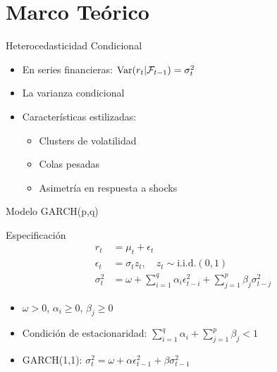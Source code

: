 \section{Marco Teórico}

\begin{frame}{Heterocedasticidad Condicional}
    \begin{itemize}
        \item<1-> En series financieras: $\text{Var}(r_t | {\mathcal F}_{t-1}) = \sigma_t^2$
        \item<2-> La varianza condicional 
        \item<3-> Características estilizadas:
        \begin{itemize}
            \item Clusters de volatilidad
            \item Colas pesadas
            \item Asimetría en respuesta a shocks
        \end{itemize}
    \end{itemize}
    
    \vspace{1em}
    
\end{frame}

\begin{frame}{Modelo GARCH(p,q)}
    \begin{block}{Especificación}
        \begin{align}
            r_t &= \mu_t + \epsilon_t \\
            \epsilon_t &= \sigma_t z_t, \quad z_t \sim \text{i.i.d.}(0,1) \\
            \sigma_t^2 &= \omega + \sum_{i=1}^q \alpha_i \epsilon_{t-i}^2 + \sum_{j=1}^p \beta_j \sigma_{t-j}^2
        \end{align}
    \end{block}
    
    \vspace{0.5em}
    
    \begin{itemize}
        \item<2-> $\omega > 0$, $\alpha_i \geq 0$, $\beta_j \geq 0$
        \item<3-> Condición de estacionaridad: $\sum_{i=1}^q \alpha_i + \sum_{j=1}^p \beta_j < 1$
        \item<4-> GARCH(1,1): $\sigma_t^2 = \omega + \alpha \epsilon_{t-1}^2 + \beta \sigma_{t-1}^2$
    \end{itemize}
\end{frame}


